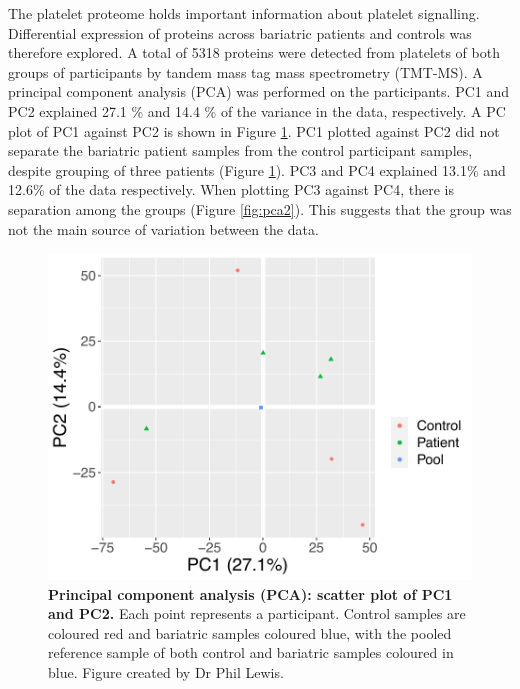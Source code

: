 \documentclass[11pt,twoside]{bristolthesis}
\begin{document}
The platelet proteome holds important information about platelet signalling. Differential expression of proteins across bariatric patients and controls was therefore explored. A total of 5318 proteins were detected from platelets of both groups of participants by tandem mass tag mass spectrometry (TMT-MS). A principal component analysis (PCA) was performed on the participants. PC1 and PC2 explained 27.1 \% and 14.4 \% of the variance in the data, respectively. A PC plot of PC1 against PC2 is shown in Figure \ref{fig:pca}. PC1 plotted against PC2 did not separate the bariatric patient samples from the control participant samples, despite grouping of three patients (Figure \ref{fig:pca}). PC3 and PC4 explained 13.1\% and 12.6\% of the data respectively. When plotting PC3 against PC4, there is separation among the groups (Figure \ref{fig:pca2}). This suggests that the group was not the main source of variation between the data.



\begin{figure}

{\centering \includegraphics[width=0.8\linewidth]{figure/Bariatric_study/Proteomic_PCA} 

}

\caption[Principal component analysis (PCA): scatter plot of PC1 and PC2]{\textbf{Principal component analysis (PCA): scatter plot of PC1 and PC2.} Each point represents a participant. Control samples are coloured red and bariatric samples coloured blue, with the pooled reference sample of both control and bariatric samples coloured in blue. Figure created by Dr Phil Lewis.}\label{fig:pca}
\end{figure}
\end{document}
